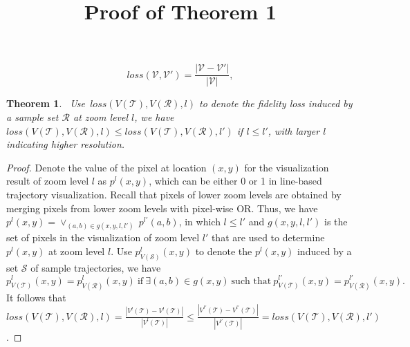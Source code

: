 \documentclass[11pt]{article}
\title{Proof of Theorem 1}
\author{
}
\newtheorem{theorem}{Theorem}
\begin{document}
	
\maketitle



\begin{equation}\label{eqref:loss}
loss(\mathcal{V}, \mathcal{V}')=\frac{|\mathcal{V}-\mathcal{V}'|}{|\mathcal{V}|},
\end{equation}

\begin{theorem}~\label{the:level}
	Use~$loss(V(\mathcal{T}), V(\mathcal{R}), l)$ to denote the fidelity loss induced by a sample set $\mathcal{R}$ at zoom level $l$, we have~ $loss(V(\mathcal{T}), V(\mathcal{R}), l) \le loss(V(\mathcal{T}), V(\mathcal{R}), l')$ if $l\le l'$, with larger $l$ indicating higher resolution.
\end{theorem}

\begin{proof}
	Denote the value of the pixel at location $(x,y)$ for the visualization result of zoom level $l$ as $p^l(x,y)$, which can be either 0 or 1 in line-based trajectory visualization. Recall that pixels of lower zoom levels are obtained by merging pixels from lower zoom levels with pixel-wise OR. Thus, we have $p^l(x,y)=\vee_{(a,b)\in g(x,y,l,l')} \ p^{l'}(a,b)$, in which  $l\le l'$ and $g(x,y,l,l')$ is the set of pixels in the visualization of zoom level $l'$ that are used to determine $p^l(x,y)$ at zoom level $l$. Use $p^l_{V(\mathcal{S})}(x,y)$ to denote the $p^l(x,y)$ induced by a set $\mathcal{S}$ of sample trajectories, we have 
	\begin{equation}\nonumber
	p^l_{V(\mathcal{T})}(x,y)=p^l_{V(\mathcal{R})}(x,y) \ \text{if} \ \exists (a,b)\in g(x,y) \ \text{such that} \ p^{l'}_{V(\mathcal{T})}(x,y)=p^{l'}_{V(\mathcal{R})}(x,y). 
	\end{equation}      
	It follows that $loss(V(\mathcal{T}), V(\mathcal{R}), l)=\frac{|V^l(\mathcal{T})-V^l(\mathcal{T})|}{|V^l(\mathcal{T})|}\le \frac{|V^{l'}(\mathcal{T})-V^{l'}(\mathcal{T})|}{|V^{l'}(\mathcal{T})|}=loss(V(\mathcal{T}), V(\mathcal{R}), l')$. 
	      
\end{proof}
\end{document}
